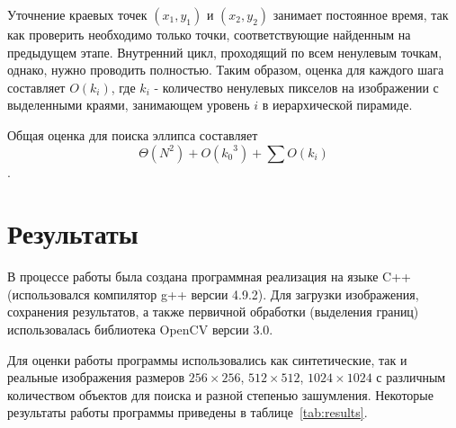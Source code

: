 Уточнение краевых точек \((x_1,y_1)\) и \((x_2,y_2)\) занимает постоянное время, так как проверить необходимо только точки, соответствующие найденным на предыдущем этапе.
Внутренний цикл, проходящий по всем ненулевым точкам, однако, нужно проводить полностью. 
Таким образом, оценка для каждого шага составляет \(O(k_i)\), где \(k_i\) - количество ненулевых пикселов на изображении с выделенными краями, занимающем уровень \(i\) в иерархической пирамиде.

Общая оценка для поиска эллипса составляет \[\Theta(N^2) + \displaystyle O({k_0}^3) + \sum O(k_i) \].

\section{Результаты}
В процессе работы была создана программная реализация на языке C++ (использовался компилятор g++ версии 4.9.2). 
Для загрузки изображения, сохранения результатов, а также первичной обработки (выделения границ) использовалась библиотека OpenCV версии 3.0.

Для оценки работы программы использовались как синтетические, так и реальные изображения размеров $256\times256$, $512\times512$, $1024\times1024$ с различным количеством объектов для поиска и разной степенью зашумления.
Некоторые результаты работы программы приведены в таблице~\ref{tab:results}.

